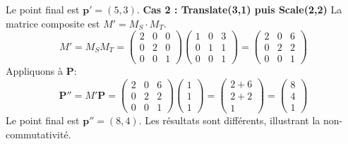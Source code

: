 Le point final est \( \mathbf{p'} = (5, 3) \).
\textbf{Cas 2 : Translate(3,1) puis Scale(2,2)}
La matrice composite est \( M' = M_S \cdot M_T \).
\[ M' = M_S M_T = \begin{pmatrix} 2 & 0 & 0 \\ 0 & 2 & 0 \\ 0 & 0 & 1 \end{pmatrix} \begin{pmatrix} 1 & 0 & 3 \\ 0 & 1 & 1 \\ 0 & 0 & 1 \end{pmatrix} = \begin{pmatrix} 2 & 0 & 6 \\ 0 & 2 & 2 \\ 0 & 0 & 1 \end{pmatrix} \]
Appliquons à \( \mathbf{P} \):
\[ \mathbf{P''} = M' \mathbf{P} = \begin{pmatrix} 2 & 0 & 6 \\ 0 & 2 & 2 \\ 0 & 0 & 1 \end{pmatrix} \begin{pmatrix} 1 \\ 1 \\ 1 \end{pmatrix} = \begin{pmatrix} 2+6 \\ 2+2 \\ 1 \end{pmatrix} = \begin{pmatrix} 8 \\ 4 \\ 1 \end{pmatrix} \]
Le point final est \( \mathbf{p''} = (8, 4) \).
Les résultats sont différents, illustrant la non-commutativité.
